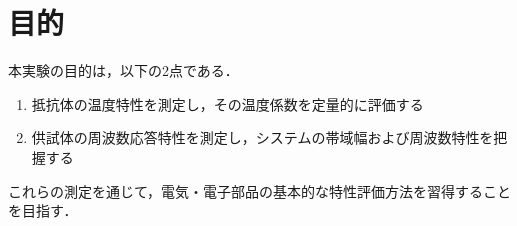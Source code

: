 
\section{目的}

本実験の目的は，以下の2点である．

\begin{enumerate}
    \item 抵抗体の温度特性を測定し，その温度係数を定量的に評価する
    \item 供試体の周波数応答特性を測定し，システムの帯域幅および周波数特性を把握する
\end{enumerate}

これらの測定を通じて，電気・電子部品の基本的な特性評価方法を習得することを目指す．
